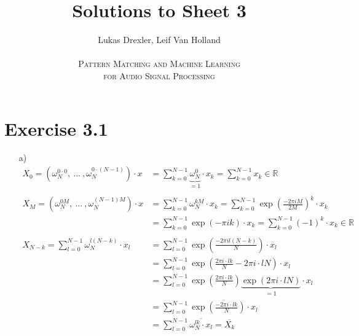 \documentclass[12pt]{article}
\newcommand{\R}{\mathbb{R}}
\begin{document}
\title{Solutions to Sheet 3}
\author{Lukas Drexler, Leif Van Holland \\ \\
\textsc{Pattern Matching and Machine Learning} \\
\textsc{for Audio Signal Processing}}
\maketitle

\section*{Exercise 3.1}
\begin{itemize}
    \item[a)] \begin{align*}
        X_0 = \left(\omega_N^{0\cdot 0},\: ...\:, \omega_N^{0\cdot (N-1)}\right)\cdot x
        &=\sum_{k=0}^{N-1} \underbrace{\omega_N^0}_{=1}\cdot x_k
        = \sum_{k=0}^{N-1} x_k \in \R \\
        \\
        X_M = \left(\omega_N^{0M},\: ...\:, \omega_N^{(N-1)M}\right)\cdot x
        &= \sum_{k=0}^{N-1}\omega_N^{k M}\cdot x_k
        = \sum_{k=0}^{N-1}\exp\left(\frac{-2\pi i M}{2M}\right)^k\cdot x_k \\
        &= \sum_{k=0}^{N-1}\exp(-\pi i k)\cdot x_k = \sum_{k=0}^{N-1} (-1)^k \cdot x_k \in \R \\
        \\
        X_{N-k} = \sum_{l=0}^{N-1} \omega_N^{l(N-k)}\cdot x_l 
        &= \sum_{l=0}^{N-1} \exp\left(\frac{-2\pi i l (N-k)}{N}\right)\cdot x_l \\
        &= \sum_{l=0}^{N-1} \exp\left(\frac{2\pi i\cdot l k}{N} - 2\pi i\cdot l N\right)\cdot x_l \\
        &= \sum_{l=0}^{N-1} \exp\left(\frac{2\pi i\cdot l k}{N} \right) \underbrace{\exp(2\pi i\cdot l N)}_{=1}\cdot x_l \\
        &= \sum_{l=0}^{N-1} \overline{\exp\left(\frac{-2\pi i \cdot l k}{N}\right)\cdot x_l} \\
        &= \sum_{l=0}^{N-1} \overline{\omega_N^{lk} \cdot x_l} = \overline{X_k}
    \end{align*}
\end{itemize}
\end{document}
